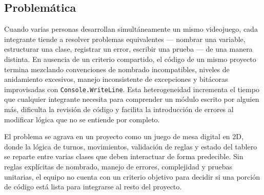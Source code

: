 \subsection{Problemática}

Cuando varias personas desarrollan simultáneamente un mismo videojuego, cada integrante tiende a resolver problemas equivalentes --- nombrar una variable, estructurar una clase, registrar un error, escribir una prueba --- de una manera distinta. En ausencia de un criterio compartido, el código de un mismo proyecto termina mezclando convenciones de nombrado incompatibles, niveles de anidamiento excesivos, manejo inconsistente de excepciones y bitácoras improvisadas con \texttt{Console.WriteLine}. Esta heterogeneidad incrementa el tiempo que cualquier integrante necesita para comprender un módulo escrito por alguien más, dificulta la revisión de código y facilita la introducción de errores al modificar lógica que no se entiende por completo.

El problema se agrava en un proyecto como un juego de mesa digital en 2D, donde la lógica de turnos, movimientos, validación de reglas y estado del tablero se reparte entre varias clases que deben interactuar de forma predecible. Sin reglas explícitas de nombrado, manejo de errores, complejidad y pruebas unitarias, el equipo no cuenta con un criterio objetivo para decidir si una porción de código está lista para integrarse al resto del proyecto.
